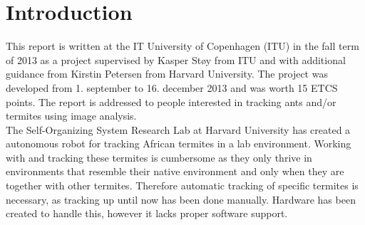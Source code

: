 
\section{Introduction}

% 
% 

This report is written at the IT University of Copenhagen (ITU) in the fall term of 2013 as a project supervised by Kasper Støy from ITU and with additional guidance from Kirstin Petersen from Harvard University. The project was developed from 1. september to 16. december 2013 and was worth 15 ETCS points. The report is addressed to people interested in tracking ants and/or termites using image analysis. \\

The Self-Organizing System Research Lab at Harvard University has created a autonomous robot for tracking African termites in a lab environment. Working with and tracking these termites is cumbersome as they only thrive in environments that resemble their native environment and only when they are together with other termites. Therefore automatic tracking of specific termites is necessary, as tracking up until now has been done manually. Hardware has been created to handle this, however it lacks proper software support. \\

